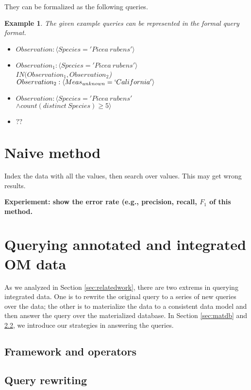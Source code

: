 \documentclass[conference]{IEEEtran}
\newtheorem{example}{Example}[section]
\begin{document}
They can be formalized as the following queries. 

\begin{example}
The given example queries can be represented in the formal query
format. 
\begin{itemize}
\item $Observation: \langle Species='Picea~rubens'\rangle$
\item $Observation_1: \langle Species='Picea~rubens'\rangle$\\
  $IN(Observation_1, Observation_2$) \\
$Observation_2: \langle Meas_{unknown}=`California'\rangle$
\item $Observation: \langle Species='Picea~rubens' $\\
$\wedge
  count(distinct~Species)\geq 5\rangle$
\item $??$
\end{itemize}

\end{example}

\section{Naive method}\label{sec:naive}
Index the data with all the values, then search over values. 
This may get wrong results. 

{\bf Experiement: show the error rate (e.g., precision, recall, $F_1$ of this method.}

\section{Querying annotated and integrated OM data}

As we analyzed in Section \ref{sec:relatedwork}, there are two extrems
in querying integrated data. 
One is to rewrite the original query to a series of new queries over
the data; the other is to materialize the data to a consistent data
model and then answer the query over the materialized database. 
In Section \ref{sec:matdb} and \ref{sec:queryrewrite}, we introduce
our strategies in answering the queries. 

\subsection{Framework and operators}

\subsection{Query rewriting}\label{sec:queryrewrite}
\end{document}
